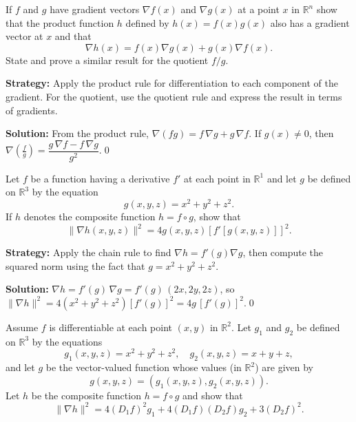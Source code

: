\begin{problembox}
\begin{problemstatement}
If \( f \) and \( g \) have gradient vectors \( \nabla f(x) \) and \( \nabla g(x) \) at a point \( x \) in \( \mathbb{R}^n \) show that the product function \( h \) defined by \( h(x) = f(x)g(x) \) also has a gradient vector at \( x \) and that
\[\nabla h(x) = f(x)\nabla g(x) + g(x)\nabla f(x).\]
State and prove a similar result for the quotient \( f/g \).
\end{problemstatement}
\end{problembox}

\noindent\textbf{Strategy:} Apply the product rule for differentiation to each component of the gradient. For the quotient, use the quotient rule and express the result in terms of gradients.

\bigskip\noindent\textbf{Solution:}
From the product rule, $\nabla(fg)=f\,\nabla g+g\,\nabla f$. If $g(x)\ne0$, then $\nabla\!\left(\frac{f}{g}\right)=\dfrac{g\,\nabla f-f\,\nabla g}{g^2}$.\qed


\begin{problembox}
\begin{problemstatement}
Let \( f \) be a function having a derivative \( f' \) at each point in \( \mathbb{R}^1 \) and let \( g \) be defined on \( \mathbb{R}^3 \) by the equation
\[g(x, y, z) = x^2 + y^2 + z^2.\]
If \( h \) denotes the composite function \( h = f \circ g \), show that
\[\| \nabla h(x, y, z) \|^2 = 4g(x, y, z)[f'[g(x, y, z)]]^2.\]
\end{problemstatement}
\end{problembox}

\noindent\textbf{Strategy:} Apply the chain rule to find \( \nabla h = f'(g) \nabla g \), then compute the squared norm using the fact that \( g = x^2 + y^2 + z^2 \).

\bigskip\noindent\textbf{Solution:}
$\nabla h=f'(g)\,\nabla g=f'(g)\,(2x,2y,2z)$, so $\|\nabla h\|^2=4(x^2+y^2+z^2)[f'(g)]^2=4g\,[f'(g)]^2$.\qed


\begin{problembox}
\begin{problemstatement}
Assume \( f \) is differentiable at each point \( (x, y) \) in \( \mathbb{R}^2 \). Let \( g_1 \) and \( g_2 \) be defined on \( \mathbb{R}^3 \) by the equations
\[g_1(x, y, z) = x^2 + y^2 + z^2, \quad g_2(x, y, z) = x + y + z,\]
and let \( g \) be the vector-valued function whose values (in \( \mathbb{R}^2 \)) are given by
\[g(x, y, z) = (g_1(x, y, z), g_2(x, y, z)).\]
Let \( h \) be the composite function \( h = f \circ g \) and show that
\[\| \nabla h \|^2 = 4(D_1f)^2g_1 + 4(D_1f)(D_2f)g_2 + 3(D_2f)^2.\]
\end{problemstatement}
\end{problembox}

